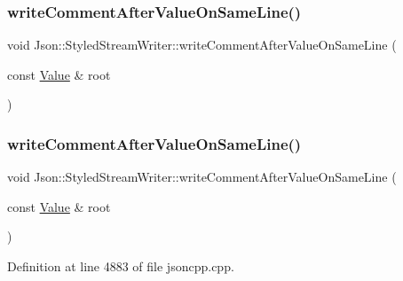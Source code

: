 \subsubsection{\texorpdfstring{write\+Comment\+After\+Value\+On\+Same\+Line()}{writeCommentAfterValueOnSameLine()}\hspace{0.1cm}{\footnotesize\ttfamily [1/2]}}
{\footnotesize\ttfamily void Json\+::\+Styled\+Stream\+Writer\+::write\+Comment\+After\+Value\+On\+Same\+Line (\begin{DoxyParamCaption}\item[{const \hyperlink{class_json_1_1_value}{Value} \&}]{root }\end{DoxyParamCaption})\hspace{0.3cm}{\ttfamily [private]}}

\hypertarget{class_json_1_1_styled_stream_writer_ad2ca860e317ca91d6b2932535b4ce9c7}{}\label{class_json_1_1_styled_stream_writer_ad2ca860e317ca91d6b2932535b4ce9c7} 
\subsubsection{\texorpdfstring{write\+Comment\+After\+Value\+On\+Same\+Line()}{writeCommentAfterValueOnSameLine()}\hspace{0.1cm}{\footnotesize\ttfamily [2/2]}}
{\footnotesize\ttfamily void Json\+::\+Styled\+Stream\+Writer\+::write\+Comment\+After\+Value\+On\+Same\+Line (\begin{DoxyParamCaption}\item[{const \hyperlink{class_json_1_1_value}{Value} \&}]{root }\end{DoxyParamCaption})\hspace{0.3cm}{\ttfamily [private]}}



Definition at line 4883 of file jsoncpp.\+cpp.

\hypertarget{class_json_1_1_styled_stream_writer_a79c3c2b320475035c47b2db484a3e434}{}\label{class_json_1_1_styled_stream_writer_a79c3c2b320475035c47b2db484a3e434} 
